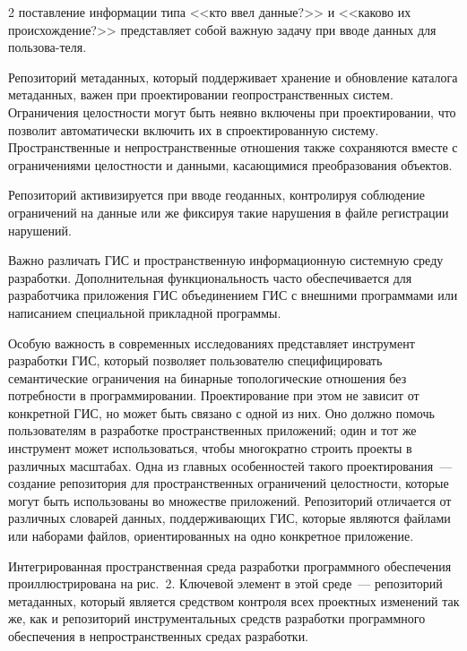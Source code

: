 \begin{multicols}{2}
\noindent
поставление информации типа <<кто 
ввел данные?>> и <<каково их происхождение?>> представляет собой важную задачу при 
вводе данных для пользова-\linebreak теля. 
      
      Репозиторий метаданных, который поддерживает хранение и обновление каталога 
метаданных, важен при проектировании геопространственных систем. Ограничения 
целостности могут быть неявно включены при проектировании, что позволит 
автоматически включить их в спроектированную систему. Пространственные и 
непространственные отношения также сохраняются вместе с ограничениями целостности и 
данными, касающимися преобразования объектов. 
      
      Репозиторий активизируется при вводе геоданных, контролируя соблюдение 
ограничений на данные или же фиксируя такие нарушения в файле регистрации 
нарушений.
      
      Важно различать ГИС и пространственную инфор\-ма\-ци\-он\-ную системную среду 
разработки. Дополнительная функциональность часто обеспечивается для разработчика 
приложения ГИС объединением ГИС с внешними программами или написанием 
специальной прикладной программы. 

Особую важность в современных исследованиях 
представляет инструмент разработки ГИС, который позволяет пользователю 
специфицировать семантические ограничения на бинарные топологические отношения без 
потребности в программировании. Проектирование при этом не зависит от конкретной 
ГИС, но может быть связано с одной из них. Оно должно помочь пользователям в 
разработке пространственных приложений; один и тот же инструмент может 
использоваться, чтобы многократно строить проекты в различных масштабах. Одна из 
главных особенностей такого проектирования~--- создание репозитория для 
пространственных ограничений целостности, которые могут быть использованы во 
множестве приложений. Репозиторий отличается от различных словарей данных, 
поддерживающих ГИС, которые являются файлами или наборами файлов, 
ориентированных на одно конкретное приложение. 

Интегрированная пространственная 
среда разработки программного обеспечения проиллюстрирована на рис.~2. Ключевой 
элемент в этой среде~--- репозиторий метаданных, который является средством контроля 
всех проектных изменений так же, как и репозиторий инструментальных средств 
разработки программного обеспечения в непространственных средах разработки. 

\begin{figure} %
 \vspace*{1pt}
 \begin{center}
 \mbox{%
 \epsfxsize=150.726mm
 }
 \end{center}
 \vspace*{-9pt}
\end{figure}


\end{multicols}
